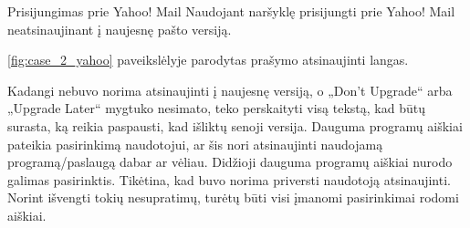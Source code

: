﻿\begin{xcase}{Prisijungimas prie Yahoo! Mail}
  \xcgoal
  {
    Naudojant naršyklę prisijungti prie Yahoo! Mail neatsinaujinant į
    naujesnę pašto versiją.
  }
  \xctools
  {
    \ref{fig:case_2_yahoo} paveikslėlyje parodytas prašymo atsinaujinti langas.

  }
  \xcresult
  {
    Kadangi nebuvo norima atsinaujinti į naujesnę versiją, o „Don't Upgrade“ arba „Upgrade Later“ 
    mygtuko nesimato, teko perskaityti visą tekstą, kad būtų surasta, ką reikia paspausti, kad 
    išliktų senoji versija.
  }
  \xcprinciples
  {
    {
      Dauguma programų aiškiai pateikia pasirinkimą naudotojui, ar
      šis nori atsinaujinti naudojamą programą/paslaugą dabar ar
      vėliau.
    }
    {
      Didžioji dauguma programų aiškiai nurodo galimas pasirinktis.
    }
  }
  \xcthoughts
  {
    Tikėtina, kad buvo norima priversti naudotoją atsinaujinti. Norint
    išvengti tokių nesupratimų, turėtų būti visi įmanomi pasirinkimai 
    rodomi aiškiai.
  }
\end{xcase}
